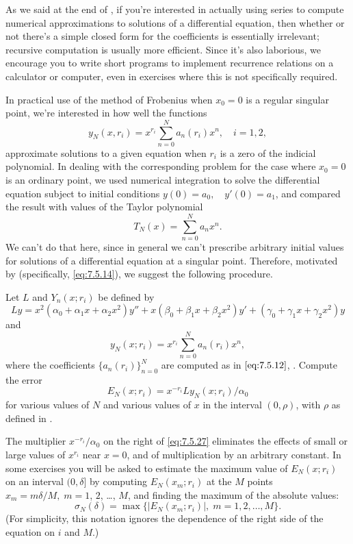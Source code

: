 \technology
\medskip

As we said at the end of , if you're interested in
actually using series to compute numerical approximations to solutions
of a differential equation, then whether or not there's a simple
closed form for the coefficients is essentially irrelevant;   recursive
computation is usually more efficient. Since it's also laborious, we
encourage you to write short programs to implement recurrence
relations on a calculator or computer, even in exercises where this is
not specifically required.

In practical use of the method of Frobenius when $x_0=0$ is a regular
singular point, we're interested in how well the functions
\[
y_N(x,r_i)=x^{r_i}\sum_{n=0}^N a_n(r_i)x^n,\quad i=1,2,
\]
approximate solutions to a given equation when $r_i$ is a zero of the
indicial polynomial. In dealing with the corresponding problem for the
case where $x_0=0$ is an ordinary point, we used numerical integration
to solve the differential equation subject to initial conditions
$y(0)=a_0,\quad y'(0)=a_1$, and compared the result with values of the
Taylor polynomial
\[
T_N(x)=\sum_{n=0}^Na_nx^n.
\]
We can't do that here, since in general we can't prescribe
arbitrary initial values for solutions of a differential equation at a
singular point. Therefore, motivated by 
(specifically, \eqref{eq:7.5.14}), we suggest the following  procedure.

\begin{remark*}
Let $L$ and $Y_n(x; r_i)$ be defined by
\[
Ly=
x^2(\alpha_0+\alpha_1x+\alpha_2x^2)y''+x(\beta_0+\beta_1x+\beta_2x^2)y'
+(\gamma_0+\gamma_1x+\gamma_2x^2)y
\]
and
\[
y_N(x;r_i)=x^{r_i}\sum_{n=0}^N a_n(r_i)x^n,
\]
where the coefficients $\{a_n(r_i)\}_{n=0}^N$ are computed as in
$\eqref{eq:7.5.12}$, . Compute the error
\begin{equation} \label{eq:7.5.27}
E_N(x;r_i)=x^{-r_i}Ly_N(x;r_i)/\alpha_0
\end{equation}
for various values of $N$ and various values of $x$ in the interval
$(0,\rho)$, with $\rho$ as defined in .
\end{remark*}

\medskip

The multiplier $x^{-r_i}/\alpha_0$ on the right of \eqref{eq:7.5.27}
eliminates the effects of small or large values of $x^{r_i}$ near
$x=0$, and of multiplication by an arbitrary constant. In some
exercises you will be asked to estimate the maximum value of
$E_N(x; r_i)$ on an interval $(0,\delta]$ by computing $E_N(x_m;r_i)$
at the $M$ points $x_m=m\delta/M,\; m=1$, $2$, \dots, $M$, and finding the
maximum of the absolute values:
\begin{equation} \label{eq:7.5.28}
\sigma_N(\delta)=\max\{|E_N(x_m;r_i)|,\;   m=1,2,\dots,M\}.
\end{equation}
(For simplicity, this notation ignores the dependence of
the right side of the equation on $i$ and $M$.)

